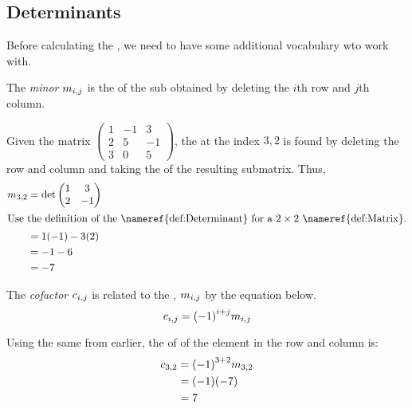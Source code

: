 \subsection{Determinants}\label{subsec:Determinants}
Before calculating the , we need to have some additional vocabulary wto work with.

\begin{definition}[Minor]\label{def:Minor}
  The \emph{minor} $m_{i,j}$ is the  of the sub obtained by deleting the $i$th row and $j$th column.
\end{definition}

\begin{blackbox}
  Given the matrix $
  \begin{pmatrix}
    1 & -1 & 3 \\
    2 & 5 & -1 \\
    3 & 0 & 5
  \end{pmatrix}$, the  at the index $3,2$ is found by deleting the  row and  column and taking the  of the resulting submatrix.
  Thus,
  \begin{align*}
    \Minor{3}{2} &= \det
                   \begin{pmatrix}
                     1 & 3 \\
                     2 & -1
                   \end{pmatrix} \\
    \intertext{Use the definition of the \nameref{def:Determinant} for a $2 \by 2$ \nameref{def:Matrix}.}
                 &= 1(-1) - 3(2) \\
                 &= -1 - 6 \\
                 &= -7
  \end{align*}
\end{blackbox}

\begin{definition}[Cofactor]\label{def:Cofactor}
  The \emph{cofactor} $c_{i,j}$ is related to the , $m_{i,j}$ by the equation below.
  \begin{equation}\label{eq:Cofactor}
    c_{i,j} = {(-1)}^{i + j} m_{i,j}
  \end{equation}
\end{definition}

\begin{blackbox}
  Using the same  from earlier, the  of of the element in the  row and  column is:
  \begin{align*}
    c_{3,2} &= {(-1)}^{3+2} m_{3,2} \\
                    &= (-1) (-7) \\
                    &= 7
  \end{align*}
\end{blackbox}


